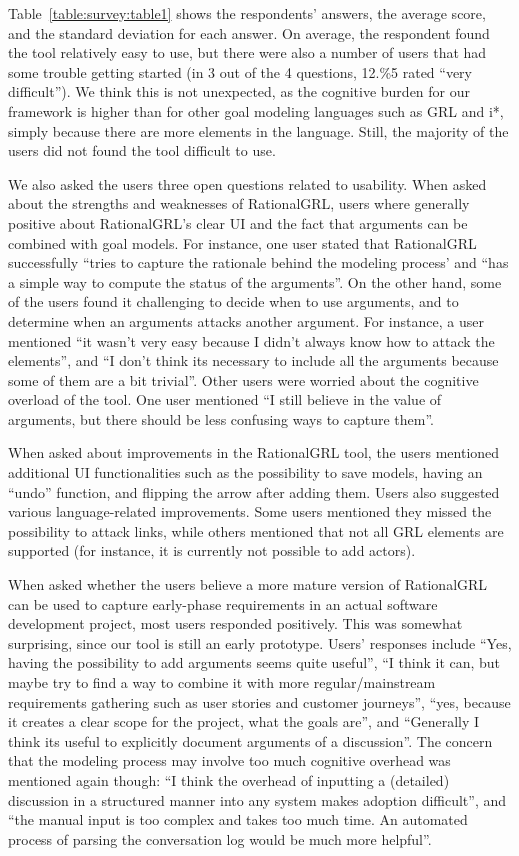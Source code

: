 Table~\ref{table:survey:table1} shows the respondents' answers, the average score, and the standard deviation for each answer. On average, the respondent found the tool relatively easy to use, but there were also a number of users that had some trouble getting started (in 3 out of the 4 questions, 12.\%5 rated ``very difficult''). We think this is not unexpected, as the cognitive burden for our framework is higher than for other goal modeling languages such as GRL and i*, simply because there are more elements in the language. Still, the majority of the users did not found the tool difficult to use.

We also asked the users three open questions related to usability. When asked about the strengths and weaknesses of RationalGRL, users where generally positive about RationalGRL's clear UI and the fact that arguments can be combined with goal models. For instance, one user stated that RationalGRL successfully ``tries to capture the rationale behind the modeling process' and ``has a simple way to compute the status of the arguments''. On the other hand, some of the users found it challenging to decide when to use arguments, and to determine when an arguments attacks another argument. For instance, a user mentioned ``it wasn't very easy because I didn't always know how to attack the elements'', and ``I don't think its necessary to include all the arguments because some of them are a bit trivial''. Other users were worried about the cognitive overload of the tool. One user mentioned ``I still believe in the value of arguments, but there should be less confusing ways to capture them''. 

When asked about improvements in the RationalGRL tool, the users mentioned additional UI functionalities such as the possibility to save models, having an ``undo'' function, and flipping the arrow after adding them. Users also suggested various language-related improvements. Some users mentioned they missed the possibility to attack links, while others mentioned that not all GRL elements are supported (for instance, it is currently not possible to add actors).

When asked whether the users believe a more mature version of RationalGRL can be used to capture early-phase requirements in an actual software development project, most users responded positively. This was somewhat surprising, since our tool is still an early prototype. Users' responses include ``Yes, having the possibility to add arguments seems quite useful'', ``I think it can, but maybe try to find a way to combine it with more regular/mainstream requirements gathering such as user stories and customer journeys'', ``yes, because it creates a clear scope for the project, what the goals are'', and ``Generally I think its useful to explicitly document arguments of a discussion''. The concern that the modeling process may involve too much cognitive overhead was mentioned again though: ``I think the overhead of inputting a (detailed) discussion in a structured manner into any system makes adoption difficult'', and ``the manual input is too complex and takes too much time. An automated process of parsing the conversation log would be much more helpful''. 

